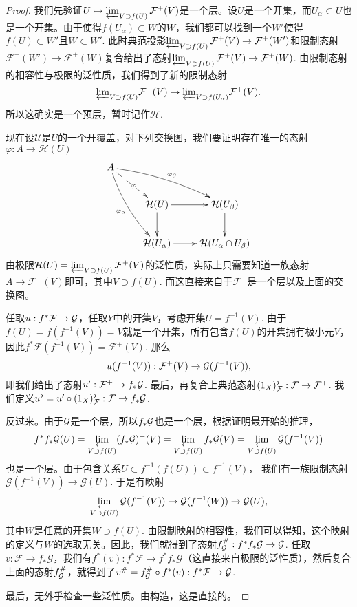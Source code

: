 \begin{proof}
	我们先验证$U\mapsto \varprojlim_{V\supset f(U)} \mathcal{F}^+(V)$是一个层。设$U$是一个开集，而$U_\alpha\subset U$也是一个开集。由于使得$f(U_\alpha)\subset W$的$W$，我们都可以找到一个$W'$使得$f(U)\subset W'$且$W\subset W'$. 此时典范投影$\varprojlim_{V\supset f(U)} \mathcal{F}^+(V)\to \mathcal{F}^+(W')$和限制态射$\mathcal{F}^+(W')\to \mathcal{F}^+(W)$复合给出了态射$\varprojlim_{V\supset f(U)} \mathcal{F}^+(V)\to \mathcal{F}^+(W)$. 由限制态射的相容性与极限的泛性质，我们得到了新的限制态射
	\[
	{\varprojlim}_{V\supset f(U)} \mathcal{F}^+(V)\to {\varprojlim}_{V\supset f(U_\alpha)} \mathcal{F}^+(V).
	\]
	所以这确实是一个预层，暂时记作$\mathcal{H}$.

	现在设$\mathscr{U}$是$U$的一个开覆盖，对下列交换图，我们要证明存在唯一的态射$\varphi:A\to \mathcal{H}(U)$
	\[
		\xymatrix{
			A\ar@/_/[ddr]_{\varphi_{\alpha}}\ar@/^/[drr]^{\varphi_{\beta}}\ar@{-->}[dr]|{\varphi}&& \\
			&\mathcal{H}(U)\ar[r]\ar[d]&\mathcal{H}(U_\beta)\ar[d]\\
			&\mathcal{H}(U_\alpha)\ar[r]&\mathcal{H}(U_{\alpha}\cap U_{\beta})
		}
	\]
	由极限$\mathcal{H}(U)=\varprojlim_{V\supset f(U)} \mathcal{F}^+(V)$的泛性质，实际上只需要知道一族态射$A\to \mathcal{F}^+(V)$即可，其中$V\supset f(U)$. 而这直接来自于$\mathcal{F}^+$是一个层以及上面的交换图。

	任取$u:f^*\mathcal{F}\to\mathcal{G}$，任取$Y$中的开集$V$，考虑开集$U=f^{-1}(V)$. 由于$f(U)=f(f^{-1}(V))=V$就是一个开集，所有包含$f(U)$的开集拥有极小元$V$，因此$f^*\mathcal{F}(f^{-1}(V))=\mathcal{F}^+(V)$.
	那么
	\[
	u(f^{-1}(V)):\mathcal{F}^+(V)\to \mathcal{G}(f^{-1}(V)),
	\]
	即我们给出了态射$u':\mathcal{F}^+\to f_*\mathcal{G}$. 最后，再复合上典范态射$(1_X)^\flat_{\mathcal{F}}:\mathcal{F} \to \mathcal{F}^+$. 我们定义$u^\flat=u'\circ (1_X)^\flat_{\mathcal{F}}: \mathcal{F}\to f_*\mathcal{G}$.

	反过来。由于$\mathcal{G}$是一个层，所以$f_*\mathcal{G}$也是一个层，根据证明最开始的推理，
	\[
		f^*f_*\mathcal{G}(U)=\varprojlim_{V\supset f(U)} (f_*\mathcal{G})^+(V)=\varprojlim_{V\supset f(U)} f_*\mathcal{G}(V)=\varprojlim_{V\supset f(U)} \mathcal{G}(f^{-1}(V))
	\]
	也是一个层。由于包含关系$U\subset f^{-1}(f(U))\subset f^{-1}(V)$，
	我们有一族限制态射$\mathcal{G}(f^{-1}(V))\to \mathcal{G}(U)$. 于是有映射
	\[
	\varprojlim_{V\supset f(U)} \mathcal{G}(f^{-1}(V))\to \mathcal{G}(f^{-1}(W))\to \mathcal{G}(U),
	\]
	其中$W$是任意的开集$W\supset f(U)$. 由限制映射的相容性，我们可以得知，这个映射的定义与$W$的选取无关。因此，我们就得到了态射$f^\#_{\mathcal{G}}:f^*f_*\mathcal{G}\to \mathcal{G}$. 任取$v:\mathcal{F}\to f_*\mathcal{G}$，我们有$f^*(v):f^*\mathcal{F}\to f^*f_*\mathcal{G}$（这直接来自极限的泛性质），然后复合上面的态射$f^\#_{\mathcal{G}}$，就得到了$v^\#=f^\#_{\mathcal{G}}\circ f^*(v):f^*\mathcal{F}\to \mathcal{G}$.

	最后，无外乎检查一些泛性质。由构造，这是直接的。
\end{proof}

